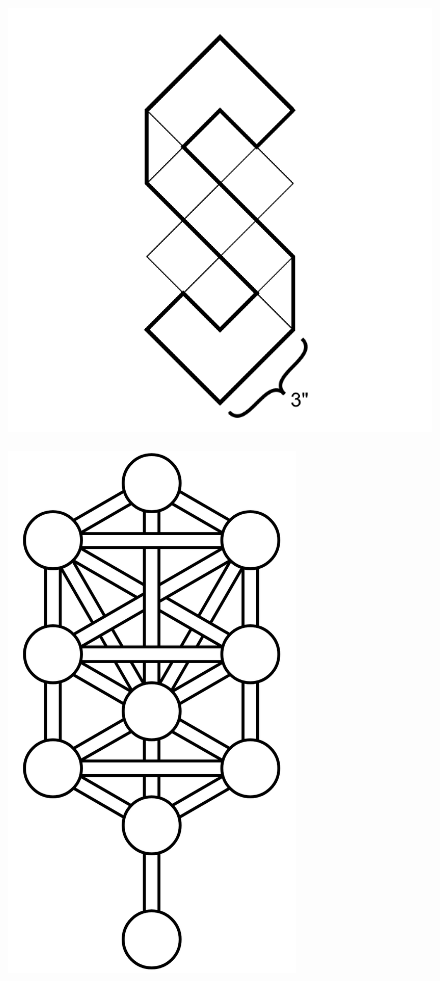 \documentclass[17pt]{extreport}
\begin{document}
	\begin{figure}
		\centering
		\includegraphics[width=6.25in]{imageserver/uploadimages/image10.png}
	\end{figure}
	
	\begin{figure}
		\centering
		\includegraphics[width=3in]{imageserver/uploadimages/image1.png}
	\end{figure}
	
	
	
	
	
\end{document}
